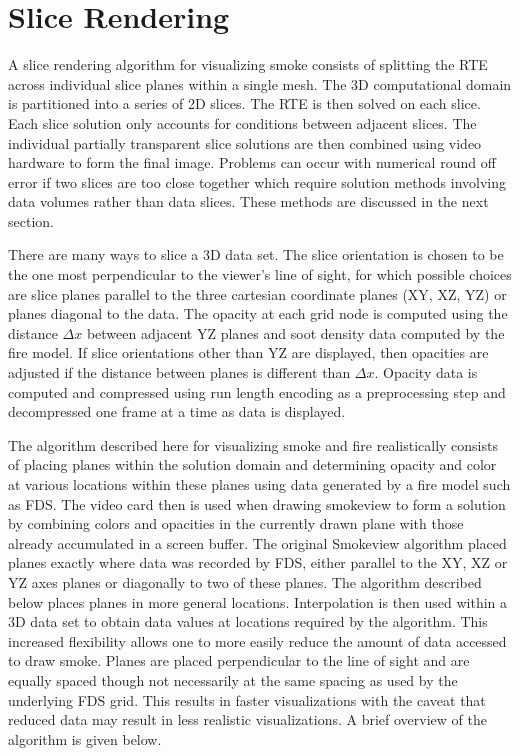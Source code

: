 {\section{Slice Rendering}
A slice rendering algorithm for visualizing smoke consists of
splitting the RTE across individual slice planes within a single
mesh.  The 3D computational domain is partitioned into a series of
2D slices.  The RTE is then solved on each slice.  Each slice
solution only accounts for conditions between adjacent slices.
The individual partially transparent slice solutions are then
combined using video hardware to form the final image.   Problems
can occur with numerical round off error if two slices are too
close together which require solution methods  involving data
volumes rather than data slices. These methods are discussed in
the next section.

There are many ways to slice a 3D data set.  The slice orientation
is chosen to be the one most perpendicular to the viewer's line of
sight, for which possible choices are slice planes parallel to the
three cartesian coordinate planes (XY, XZ, YZ) or planes diagonal
to the data.  The opacity at each grid node is computed using the
distance $\Delta x$ between adjacent YZ planes and soot density
data computed by the fire model.  If slice orientations other than
YZ are displayed, then opacities are adjusted if the distance
between planes is different than $\Delta x$.  Opacity data is
computed and compressed using run length encoding as a
preprocessing step and decompressed one frame at a time as data is
displayed.

The algorithm described here for visualizing smoke and fire realistically consists of placing
planes within the solution domain and determining opacity and color
at various locations within these planes
using data generated by a fire model such as FDS.  The video card then is
used when drawing smokeview to form a solution by combining colors and opacities in the currently drawn
plane with those already accumulated in a screen buffer.
The original Smokeview algorithm placed planes exactly where data was recorded by FDS,
either parallel to the XY, XZ or YZ axes planes or diagonally to two of these planes.
The algorithm described below places planes in more general locations. Interpolation is then used
within a 3D data set to obtain data values at locations required by the algorithm.
This increased flexibility
allows one to more easily reduce the amount of data accessed to draw smoke.
Planes are placed perpendicular to the line of sight and are equally spaced though not
necessarily at the same spacing as used by the underlying FDS grid.
This results in faster visualizations with the caveat that reduced data may result
in less realistic visualizations.  A brief overview of the algorithm is given below.

}
